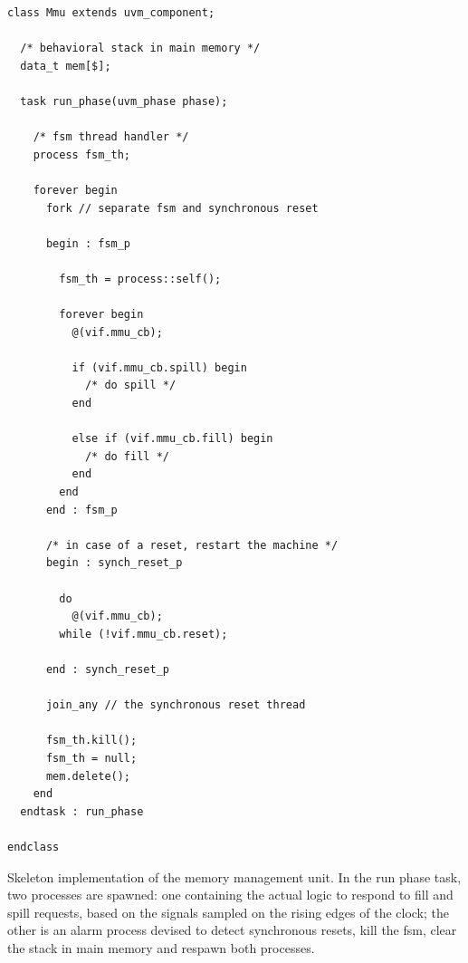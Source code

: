 \begin{listing}
\begin{verbatim}
class Mmu extends uvm_component;

  /* behavioral stack in main memory */
  data_t mem[$];

  task run_phase(uvm_phase phase);

    /* fsm thread handler */
    process fsm_th;

    forever begin
      fork // separate fsm and synchronous reset

      begin : fsm_p

        fsm_th = process::self();

        forever begin
          @(vif.mmu_cb);

          if (vif.mmu_cb.spill) begin
            /* do spill */
          end

          else if (vif.mmu_cb.fill) begin
            /* do fill */
          end
        end
      end : fsm_p

      /* in case of a reset, restart the machine */
      begin : synch_reset_p

        do
          @(vif.mmu_cb);
        while (!vif.mmu_cb.reset);

      end : synch_reset_p

      join_any // the synchronous reset thread

      fsm_th.kill();
      fsm_th = null;
      mem.delete();
    end
  endtask : run_phase

endclass
\end{verbatim}
\caption{Skeleton implementation of the memory management unit. In the run phase task, two processes are spawned: one containing the actual logic to respond to fill and spill requests, based on the signals sampled on the rising edges of the clock; the other is an alarm process devised to detect synchronous resets, kill the \acs{fsm}, clear the stack in main memory and respawn both processes.}
\label{list:wrf_mmu}
\end{listing}

